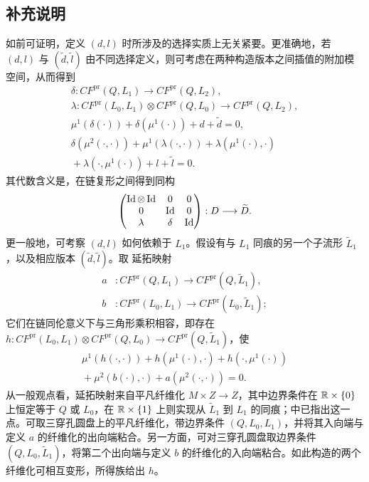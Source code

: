 \subsection{补充说明}\label{sec:17f}
如前可证明，定义 $(d,l)$ 时所涉及的选择实质上无关紧要。更准确地，若 $(d,l)$ 与 $(\tilde d,\tilde l)$
由不同选择定义，则可考虑在两种构造版本之间插值的附加模空间，从而得到
\[
\boxed{\begin{gathered}
\delta:CF^{\mathrm{pr}}(Q,L_1)\longrightarrow CF^{\mathrm{pr}}(Q,L_2),\\
\lambda:CF^{\mathrm{pr}}(L_0,L_1)\otimes CF^{\mathrm{pr}}(Q,L_0)\longrightarrow CF^{\mathrm{pr}}(Q,L_2),\\
\mu^1(\delta(\cdot))+\delta(\mu^1(\cdot))+d+\tilde d=0,\\
\delta(\mu^2(\cdot,\cdot))+\mu^1(\lambda(\cdot,\cdot))
+\lambda(\mu^1(\cdot),\cdot)\\
{}+\lambda(\cdot,\mu^1(\cdot))+l+\tilde l=0.
\end{gathered}}
\]
其代数含义是，在链复形之间得到同构
\begin{equation}\label{eq:17.17}
\begin{pmatrix}
\operatorname{Id}\otimes\operatorname{Id}&0&0\\0&\operatorname{Id}&0\\\lambda&\delta&\operatorname{Id}
\end{pmatrix}:D\longrightarrow\widetilde D.
\end{equation}
更一般地，可考察 $(d,l)$ 如何依赖于 $L_1$。假设有与 $L_1$ 同痕的另一个子流形 $\widetilde L_1$，以及相应版本 $(\tilde d,\tilde l)$。取
延拓映射
\[
\begin{aligned}
a &:CF^{\mathrm{pr}}(Q,L_1)\longrightarrow CF^{\mathrm{pr}}(Q,\widetilde L_1),\\
b &:CF^{\mathrm{pr}}(L_0,L_1)\longrightarrow CF^{\mathrm{pr}}(L_0,\widetilde L_1);
\end{aligned}
\]
它们在链同伦意义下与三角形乘积相容，即存在 $h:CF^{\mathrm{pr}}(L_0,L_1)\otimes CF^{\mathrm{pr}}(Q,L_0)\to CF^{\mathrm{pr}}(Q,\widetilde L_1)$，使
\[
\begin{aligned}
\mu^1(h(\cdot,\cdot))+h(\mu^1(\cdot),\cdot)+h(\cdot,\mu^1(\cdot))\\
{}+\mu^2(b(\cdot),\cdot)+a(\mu^2(\cdot,\cdot))=0.
\end{aligned}
\]
从一般观点看，延拓映射来自平凡纤维化 $M\times Z\to Z$，其中边界条件在 $\mathbb R\times\{0\}$ 上恒定等于 $Q$ 或 $L_0$，在 $\mathbb R\times\{1\}$ 上则实现从 $\widetilde L_1$ 到 $L_1$ 的同痕；中已指出这一点。可取三穿孔圆盘上的平凡纤维化，带边界条件 $(Q,L_0,L_1)$，并将其入向端与定义 $a$ 的纤维化的出向端粘合。另一方面，可对三穿孔圆盘取边界条件 $(Q,L_0,\widetilde L_1)$，将第二个出向端与定义 $b$ 的纤维化的入向端粘合。如此构造的两个纤维化可相互变形，所得族给出 $h$。

